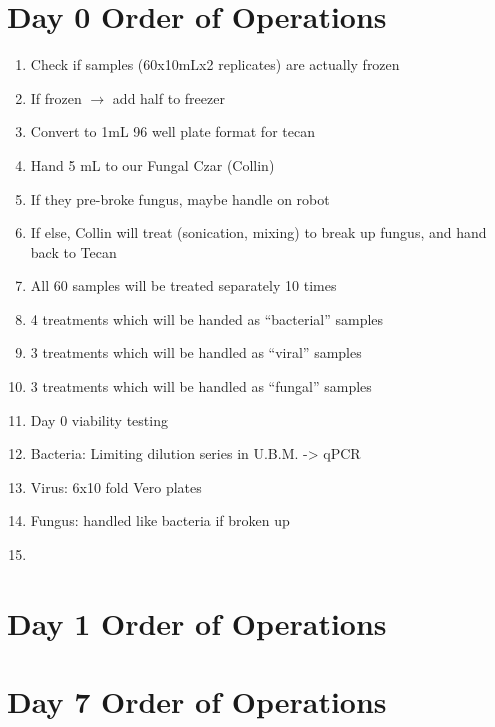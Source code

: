 \documentclass{article}
\begin{document}
\section*{Day 0 Order of Operations} \label{day0instructions}

\begin{enumerate}
    \item Check if samples (60x10mLx2 replicates) are actually frozen
    \item If frozen $\rightarrow$ add half to freezer
    \item Convert to 1mL 96 well plate format for tecan
    \item Hand 5 mL to our Fungal Czar (Collin)
    \item If they pre-broke fungus, maybe handle on robot
    \item If else, Collin will treat (sonication, mixing) to break up fungus, and hand back to Tecan
    \item All 60 samples will be treated separately 10 times
    \item 4 treatments which will be handed as “bacterial” samples
    \item 3 treatments which will be handled as “viral” samples
    \item 3 treatments which will be handled as “fungal” samples
    \item Day 0 viability testing
    \item Bacteria: Limiting dilution series in U.B.M. -> qPCR
    \item Virus: 6x10 fold Vero plates 
    \item Fungus: handled like bacteria if broken up
    \item 
\end{enumerate}

\section*{Day 1 Order of Operations} \label{day1instructions}


\section*{Day 7 Order of Operations} \label{day7instructions}
\end{document}
